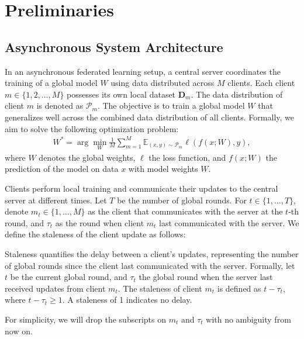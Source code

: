 \section{Preliminaries} \label{sec:preliminary}

\subsection{Asynchronous System Architecture}
In an asynchronous federated learning setup, a central server coordinates the training of a global model $W$ using data distributed across $M$ clients. Each client $m \in \{1, 2, \ldots, M\}$ possesses its own local dataset $\mathbf{D}_m$. The data distribution of client \(m\) is denoted as \(\mathcal{P}_m\).
The objective is to train a global model $W$ that generalizes well across the combined data distribution of all clients.
Formally, we aim to solve the following optimization problem:
\begin{align}
W^* = \arg \min_{W} \frac{1}{M} \sum_{m=1}^{M} \mathbb{E}_{(x,y)\sim \mathcal{P}_m} \ell \left( f(x; W), y \right),
\end{align}
where $W$ denotes the global weights, \(\ell\) the loss function, and $f(x; W)$ the prediction of the model on data $x$ with model weights $W$.

Clients perform local training and communicate their updates to the central server at different times.
Let $T$ be the number of global rounds. For $t \in \{1, \dots, T\}$, denote $m_t \in \{1, \dots, M\}$ as the client that communicates with the server at the $t$-th round, and $\tau_t$ as the round when client $m_t$ last communicated with the server. We define the staleness of the client update as follows: 
\begin{definition}[Staleness] Staleness quantifies the delay between a client's updates, representing the number of global rounds since the client last communicated with the server. Formally, let $t$ be the current global round, and $\tau_t$ the global round when the server last received updates from client $m_t$. The staleness of client $m_t$ is defined as $t - \tau_t$, where $t - \tau_t \geq 1$. A staleness of 1 indicates no delay. 
\end{definition}
For simplicity, we will drop the subscripts on $m_t$ and $\tau_t$ with no ambiguity from now on.

